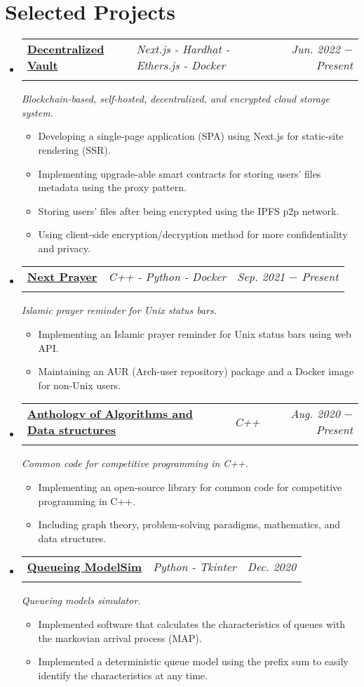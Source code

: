 \documentclass[letterpaper, 11pt]{article}
\makeatletter
\newcommand{\project}[6] {
  \vspace{-1pt}\item
  \begin{tabular*}{0.97\textwidth}[t]{ll@{\extracolsep{\fill}}r}
    #1 \href{#4}{\textbf{\color{RoyalBlue}#2}} \textbar{ } & \textit{#5} & \textit{\small #3} \\
    \vspace{-10pt}
  \end{tabular*}
  \textit{\small #6}
  \vspace{-8pt}
}
\newcommand{\subproject}[1] {
\item\small
  {#1}
  \vspace{-2pt}
}
\makeatother
\begin{document}
\section{Selected Projects}
\begin{itemize}[leftmargin=*]
  \project
  {\faIcon{cloud}}
  {Decentralized Vault}{Jun. 2022 $-$ Present}
  {https://devault.vercel.app/}{Next.js - Hardhat - Ethers.js - Docker}
  {Blockchain-based, self-hosted, decentralized, and encrypted cloud storage system.}

  \begin{itemize}
    \subproject
    {Developing a single-page application (SPA) using Next.js for static-site rendering (SSR).}
    \subproject
    {Implementing upgrade-able smart contracts for storing users' files metadata using the proxy pattern.}
    \subproject
    {Storing users' files after being encrypted using the IPFS p2p network.}
    \subproject
    {Using client-side encryption/decryption method for more confidentiality and privacy.}
  \end{itemize}\vspace{-4pt}

  \project
  {\faIcon{mosque}}
  {Next Prayer}{Sep. 2021 $-$ Present}
  {https://github.com/AbdeltwabMF/nxprayer}{C++ - Python - Docker}
  {Islamic prayer reminder for Unix status bars.}

  \begin{itemize}
    \subproject
    {Implementing an Islamic prayer reminder for Unix status bars using web API.}
    \subproject
    {Maintaining an AUR (Arch-user repository) package and a Docker image for non-Unix users.}
  \end{itemize}\vspace{-4pt}

  \project
  {\faIcon{laptop-code}}
  {Anthology of Algorithms and Data structures}{Aug. 2020 $-$ Present}
  {https://github.com/AbdeltwabMF/Anthology-of-Algorithms-and-Data-structures}{C++}
  {Common code for competitive programming in C++.}

  \begin{itemize}
    \subproject
    {Implementing an open-source library for common code for competitive programming in C++.}
    \subproject
    {Including graph theory, problem-solving paradigms, mathematics, and data structures.}
  \end{itemize}\vspace{-4pt}

  \project
  {\faIcon{user-clock}}
  {Queueing ModelSim}{Dec. 2020}
  {https://github.com/AbdeltwabMF/Queueing-ModelSim}{Python - Tkinter}
  {Queueing models simulator.}

  \begin{itemize}
    \subproject
    {Implemented software that calculates the characteristics of queues with the markovian arrival process (MAP).}
    \subproject
    {Implemented a deterministic queue model using the prefix sum to easily identify the characteristics at any time.}
  \end{itemize}\vspace{-4pt}
\end{itemize}
\end{document}
